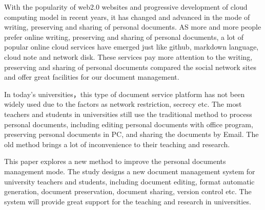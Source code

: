 \begin{eabstract} 
With the popularity of web2.0 websites and progressive development of cloud computing model in recent years, it has changed and advanced in the mode of writing, preserving and sharing of personal documents. AS more and more people prefer online writing, preserving and sharing of personal documents, a lot of popular online cloud services have emerged just like github, markdown language, cloud note and network disk. These services pay more attention to the writing, preserving and sharing of personal documents compared the social network sites and offer great facilities for our document management.

In today's universities，this type of document service platform has not  been widely used due to the factors as network restriction, secrecy etc. The most teachers and students in universities still use the traditional method to process personal documents, including editing personal documents with office program, preserving personal documents in PC, and sharing the documents by Email. The old method brings a lot of inconvenience to their teaching and research.

This paper explores a new method to improve the personal documents management mode. The study designs a new document management system for university teachers and students, including document editing, format automatic generation, document preservation, document sharing, version control etc. The system will provide great support for the teaching and research in universities.
\end{eabstract}

